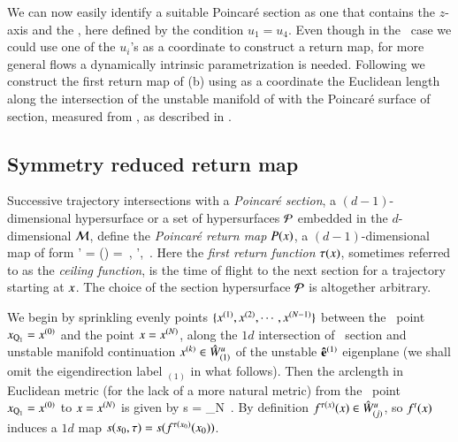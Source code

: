 \documentclass[preprint,number,sort&compress]{elsarticle}
\begin{document}
We can now easily identify a suitable Poincar\'e
section as one that contains the $z$-axis and
the \reqv, here defined by the condition $u_1=u_4$.
Even though in the \cLe\ case we could use one of the $u_i$'s as
a coordinate to construct a return map, for more general flows
a dynamically intrinsic parametrization is needed.
Following  we construct the first return map
of (b) using as a coordinate the
Euclidean length along the intersection of the unstable
manifold of  with the Poincar\'e surface of section,
measured from , as described in .


\subsection{\label{s:Poincare}Symmetry reduced return map}

Successive trajectory intersections with a {\em Poincar\'e
section}, a $(d-1)$-dim\-ens\-ion\-al hypersurface
or a set of
hypersurfaces $\cal P$ embedded in the $d$-dim\-ens\-ion\-al
{\statesp} ${\cal M}$, define the {\em Poincar\'e return map}
$P({x})$, a $(d-1)$-dim\-ens\-ion\-al map of form
\beq
\ssp' = \PoincM({\ssp})
          =  \flow{\tau(\ssp)}{\ssp}
\,,\qquad
\ssp', \ssp \in \PoincS
\,.
Here the {\em first return function} $\tau(x)$, sometimes
referred to as the {\em ceiling function}, is the time of
flight to the next section for a trajectory starting at $x$.
The choice of the section hypersurface $\cal P$ is altogether
arbitrary. 

We begin by sprinkling evenly  points
$\{x^{(1)},x^{(2)},\cdots,x^{(N-1)}\}$ between the
\reqv\ point $x_{\mathrm{Q}_{1}}=x^{(0)}$ and the point  $x=
x^{(N)}$, along the $1d$ intersection of \Poincare\ section and
unstable manifold continuation $x^{(k)} \in \hat{W}^u_{(1)}$ of the unstable ${\bf
\hat{e}}^{(1)}$ eigen\-plane (we shall omit the
eigen\-direction label ${}_{(1)}$ in what follows). Then the
arclength in Euclidean metric (for the lack of a more natural metric)
from the \reqv\ point $x_{\mathrm{Q}_{1}}=x^{(0)}$ to $x=
x^{(N)}$ is given by
\beq
s = \lim_{N\to\infty}
\,.
By definition $f^{\tau(x)}(x) \in \hat{W}^u_{(j)}$, so
$f^t(x)$ induces a $1d$ map $s(s_0,\tau) =
s(f^{\tau({x_0})}({x_0}))$.
\end{document}

